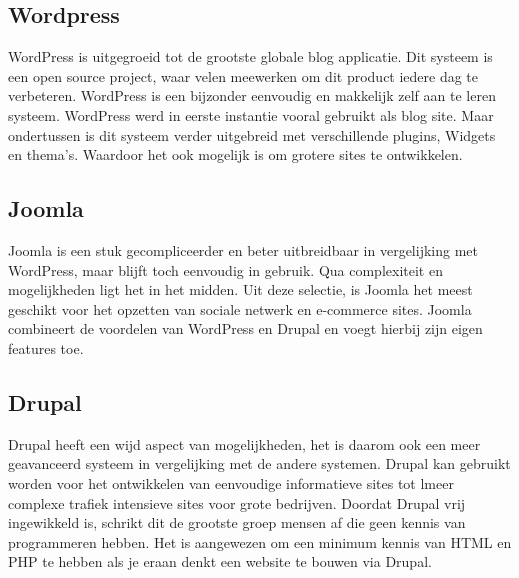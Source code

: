\subsection{Wordpress}
WordPress is uitgegroeid tot de grootste globale blog applicatie. Dit systeem is een open source project, waar velen meewerken om dit product iedere dag te verbeteren. WordPress is een bijzonder eenvoudig en makkelijk zelf aan te leren systeem. WordPress werd in eerste instantie vooral gebruikt als blog site. Maar ondertussen is dit systeem verder uitgebreid met verschillende plugins, Widgets en thema's. Waardoor het ook mogelijk is om grotere sites te ontwikkelen. 

\subsection{Joomla}
Joomla is een stuk gecompliceerder en beter uitbreidbaar in vergelijking met WordPress, maar blijft toch eenvoudig in gebruik. Qua complexiteit en mogelijkheden ligt het in het midden. Uit deze selectie, is Joomla het meest geschikt voor het opzetten van sociale netwerk en e-commerce sites. Joomla combineert de voordelen van WordPress en Drupal en voegt hierbij zijn eigen features toe. 

\subsection{Drupal}
Drupal heeft een wijd aspect van mogelijkheden, het is daarom ook een meer geavanceerd systeem in vergelijking met de andere systemen. Drupal kan gebruikt worden voor het ontwikkelen van eenvoudige informatieve sites tot lmeer complexe trafiek intensieve sites voor grote bedrijven. Doordat Drupal vrij ingewikkeld is, schrikt dit de grootste groep mensen af die geen kennis van programmeren hebben. Het is aangewezen om een minimum kennis van HTML en PHP te hebben als je eraan denkt een website te bouwen via Drupal.